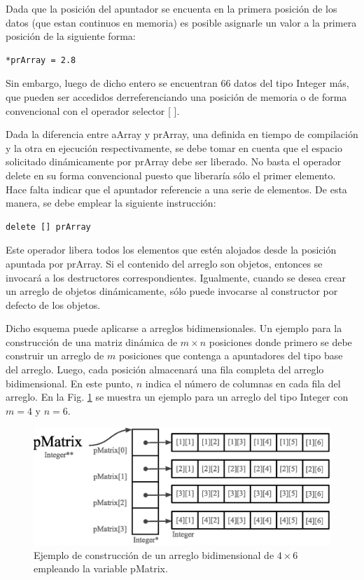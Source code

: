 Dada que la posición del apuntador se encuenta en la primera posición de los datos (que estan continuos en memoria) es posible asignarle un valor a la primera posición de la siguiente forma:

\begin{lstlisting}[upquote=true, language=pseudo]
*prArray = 2.8
\end{lstlisting}

Sin embargo, luego de dicho entero se encuentran 66 datos del tipo Integer más, que pueden ser accedidos derreferenciando una posición de memoria o de forma convencional con el operador selector [ ].

Dada la diferencia entre aArray y prArray, una definida en tiempo de compilación y la otra en ejecución respectivamente, se debe tomar en cuenta que el espacio solicitado dinámicamente por prArray debe ser liberado. No basta el operador delete en su forma convencional puesto que liberaría sólo el primer elemento. Hace falta indicar que el apuntador referencie a una serie de elementos. De esta manera, se debe emplear la siguiente instrucción:

\begin{lstlisting}[upquote=true, language=pseudo]
delete [] prArray
\end{lstlisting}

Este operador libera todos los elementos que estén alojados desde la posición apuntada por prArray. Si el contenido del arreglo son objetos, entonces se invocará a los destructores correspondientes. Igualmente, cuando se desea crear un arreglo de objetos dinámicamente, sólo puede invocarse al constructor por defecto de los objetos.

Dicho esquema puede aplicarse a arreglos bidimensionales. Un ejemplo para la construcción de una matriz dinámica de $m \times n$ posiciones donde primero se debe construir un arreglo de $m$ posiciones que contenga a apuntadores del tipo base del arreglo. Luego, cada posición almacenará una fila completa del arreglo bidimensional. En este punto, $n$ indica el número de columnas en cada fila del arreglo. En la Fig. \ref{fig:pointer1} se muestra un ejemplo para un arreglo del tipo Integer con $m=4$ y $n=6$.

\begin{figure}[!htb]
\centering
\includegraphics[scale=.65]{images/pointer1.eps}
\caption{Ejemplo de construcción de un arreglo bidimensional de $4 \times 6$ empleando la variable pMatrix.}
\label{fig:pointer1}
\end{figure}


